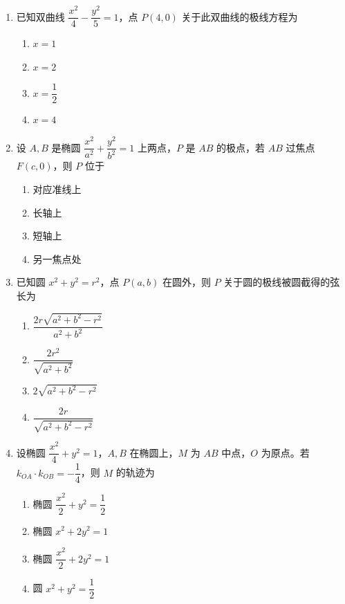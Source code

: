 \documentclass[12pt, a4paper]{ctexart}
\newcommand{\score}[1]{\hfill\makebox[2cm][l]{(#1分)}}
\begin{document}
\begin{enumerate}
\item 已知双曲线 $\dfrac{x^2}{4} - \dfrac{y^2}{5} = 1$，点 $P(4, 0)$ 关于此双曲线的极线方程为\score{5}
\begin{enumerate}[label=\Alph*.]
\item $x = 1$
\item $x = 2$
\item $x = \dfrac{1}{2}$
\item $x = 4$
\end{enumerate}

\item 设 $A, B$ 是椭圆 $\dfrac{x^2}{a^2} + \dfrac{y^2}{b^2} = 1$ 上两点，$P$ 是 $AB$ 的极点，若 $AB$ 过焦点 $F(c, 0)$，则 $P$ 位于\score{5}
\begin{enumerate}[label=\Alph*.]
\item 对应准线上
\item 长轴上
\item 短轴上
\item 另一焦点处
\end{enumerate}

\item 已知圆 $x^2 + y^2 = r^2$，点 $P(a, b)$ 在圆外，则 $P$ 关于圆的极线被圆截得的弦长为\score{5}
\begin{enumerate}[label=\Alph*.]
\item $\dfrac{2r\sqrt{a^2 + b^2 - r^2}}{a^2 + b^2}$
\item $\dfrac{2r^2}{\sqrt{a^2 + b^2}}$
\item $2\sqrt{a^2 + b^2 - r^2}$
\item $\dfrac{2r}{\sqrt{a^2 + b^2 - r^2}}$
\end{enumerate}

\item 设椭圆 $\dfrac{x^2}{4} + y^2 = 1$，$A, B$ 在椭圆上，$M$ 为 $AB$ 中点，$O$ 为原点。若 $k_{OA} \cdot k_{OB} = -\dfrac{1}{4}$，则 $M$ 的轨迹为\score{5}
\begin{enumerate}[label=\Alph*.]
\item 椭圆 $\dfrac{x^2}{2} + y^2 = \dfrac{1}{2}$
\item 椭圆 $x^2 + 2y^2 = 1$
\item 椭圆 $\dfrac{x^2}{2} + 2y^2 = 1$
\item 圆 $x^2 + y^2 = \dfrac{1}{2}$
\end{enumerate}

\end{enumerate}

\vspace{0.5cm}
\end{document}
